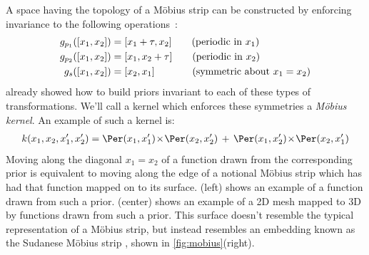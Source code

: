 A space having the topology of a M\"{o}bius strip can be constructed by enforcing invariance to the following operations~\citep[chapter 7]{reid2005geometry}:
%
\begin{align}
g_{p_1}([x_1, x_2]) & = [ x_1 + \tau, x_2] \qquad \textnormal{(periodic in $x_1$)} \label{eq:mobius_symmetry_x} \\
g_{p_2}([x_1, x_2]) & = [ x_1, x_2 + \tau] \qquad \textnormal{(periodic in $x_2$)} \label{eq:mobius_symmetry_y} \\
g_s([x_1, x_2]) & = [ x_2, x_1]  \quad \,\,\,\; \qquad \textnormal{(symmetric about $x_1 = x_2$)}
\label{eq:mobius_symmetry_xy}
\end{align}
%
 already showed how to build \gp{} priors invariant to each of these types of transformations.
We'll call a kernel which enforces these symmetries a \emph{M\"{o}bius kernel}.
An example of such a kernel is:
%
\begin{align}
k(x_1, x_2, x_1', x_2') = 
\Per(x_1, x_1') \kerntimes \Per(x_2, x_2') \kernplus
\Per(x_1, x_2') \kerntimes \Per(x_2, x_1')
\end{align}
%
Moving along the diagonal $x_1 = x_2$ of a function drawn from the corresponding \gp{} prior is equivalent to moving along the edge of a notional M\"{o}bius strip which has had that function mapped on to its surface.
(left) shows an example of a function drawn from such a prior.
(center) shows an example of a 2D mesh mapped to 3D by functions drawn from such a prior.
This surface doesn't resemble the typical representation of a M\"{o}bius strip,
but instead resembles an embedding known as the Sudanese M\"{o}bius strip \citep{sudanese1984}, shown in \cref{fig:mobius}(right).

